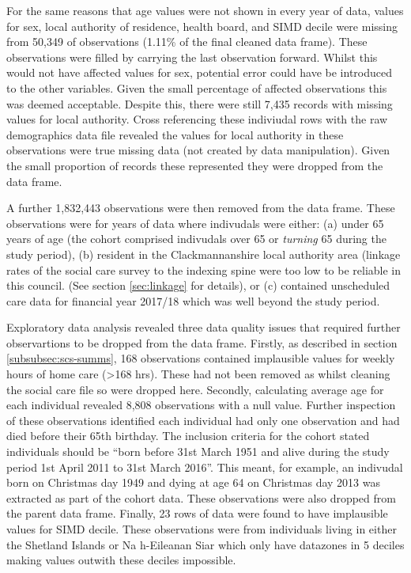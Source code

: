 \documentclass[]{article}
\begin{document}
For the same reasons that age values were not shown in every year of
data, values for sex, local authority of residence, health board, and
SIMD decile were missing from 50,349 of observations (1.11\% of the
final cleaned data frame). These observations were filled by carrying
the last observation forward. Whilst this would not have affected values
for sex, potential error could have be introduced to the other
variables. Given the small percentage of affected observations this was
deemed acceptable. Despite this, there were still 7,435 records with
missing values for local authority. Cross referencing these indiviudal
rows with the raw demographics data file revealed the values for local
authority in these observations were true missing data (not created by
data manipulation). Given the small proportion of records these
represented they were dropped from the data frame.

A further 1,832,443 observations were then removed from the data frame.
These observations were for years of data where indivudals were either:
(a) under 65 years of age (the cohort comprised indivudals over 65 or
\emph{turning} 65 during the study period), (b) resident in the
Clackmannanshire local authority area (linkage rates of the social care
survey to the indexing spine were too low to be reliable in this
council. (See section \ref{sec:linkage} for details), or (c) contained
unscheduled care data for financial year 2017/18 which was well beyond
the study period.

Exploratory data analysis revealed three data quality issues that
required further observartions to be dropped from the data frame.
Firstly, as described in section \ref{subsubsec:scs-summs}, 168
observations contained implausible values for weekly hours of home care
(\textgreater{}168 hrs). These had not been removed as whilst cleaning
the social care file so were dropped here. Secondly, calculating average
age for each individual revealed 8,808 observations with a null value.
Further inspection of these observations identified each individual had
only one observation and had died before their 65th birthday. The
inclusion criteria for the cohort stated individuals should be ``born
before 31st March 1951 and alive during the study period 1st April 2011
to 31st March 2016''. This meant, for example, an indivudal born on
Christmas day 1949 and dying at age 64 on Christmas day 2013 was
extracted as part of the cohort data. These observations were also
dropped from the parent data frame. Finally, 23 rows of data were found
to have implausible values for SIMD decile. These observations were from
individuals living in either the Shetland Islands or Na h-Eileanan Siar
which only have datazones in 5 deciles making values outwith these
deciles impossible.
\end{document}
